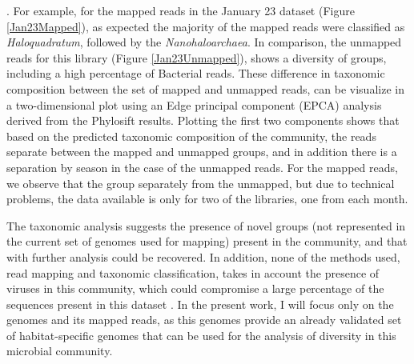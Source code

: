 . For example, for the mapped reads in the January 23 dataset (Figure \ref{Jan23Mapped}), as expected the majority of the mapped reads were classified as \textit{Haloquadratum}, followed by the \textit{Nanohaloarchaea}. In comparison, the unmapped reads for this library (Figure \ref{Jan23Unmapped}), shows a diversity of groups, including a high percentage of Bacterial reads. These difference in taxonomic composition between the set of mapped and unmapped reads, can be visualize in a two-dimensional plot using an Edge principal component (EPCA) analysis \cite{Matsen:2011wn} derived from the Phylosift results. Plotting the first two components shows that based on the predicted taxonomic composition of the community, the reads separate between the mapped and unmapped groups, and in addition there is a separation by season in the case of the unmapped reads. For the mapped reads, we observe that the group separately from the unmapped, but due to technical problems, the data available is only for two of the libraries, one from each month. 

The taxonomic analysis suggests the presence of novel groups (not represented in the current set of genomes used for mapping) present in the community, and that with further analysis could be recovered. In addition, none of the methods used, read mapping and taxonomic classification, takes in account the presence of viruses in this community, which could compromise a large percentage of the sequences present in this dataset \cite{RodriguezBrito:2010in,Emerson:tk}. In the present work, I will focus only on the genomes and its mapped reads, as this genomes provide an already validated set of habitat-specific genomes that can be used for the analysis of diversity in this microbial community.


